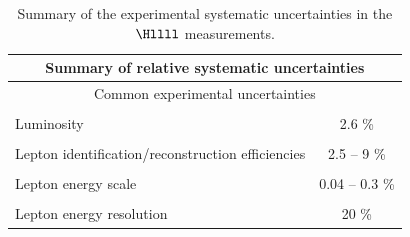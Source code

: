 \begin{table}[!htb]
\begin{center}
\small
\caption{
Summary of the experimental systematic uncertainties in the $\Hllll$ measurements. %
\label{tab:SystOverview}
}
\begin{tabular}{|lc|} 
\hline %
\hline %
\multicolumn{2}{|c|}{\textbf{Summary of relative systematic uncertainties}} \\
\hline %
\hline %
\multicolumn{2}{|c|}{Common experimental uncertainties} \\
\hline %
\vspace{-0.4cm} & \\
Luminosity & 2.6 \%  \\ 
\vspace{-0.4cm} & \\
Lepton identification/reconstruction efficiencies & 2.5 -- 9 \% \\ 
\vspace{-0.4cm} & \\
Lepton energy scale & 0.04 -- 0.3 \% \\ 
\vspace{-0.4cm} & \\
Lepton energy resolution & 20 \% \\ 


\end{tabular}
\end{center}
\end{table}
